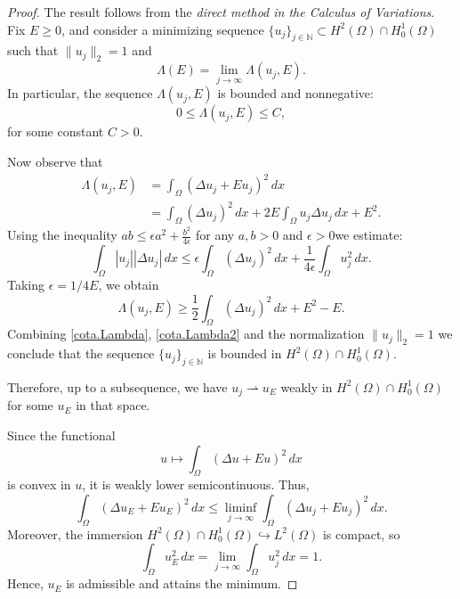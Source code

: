 \documentclass[10pt,a4paper]{amsart}
\newcommand{\N}{\mathbb{N}}
\begin{document}
\begin{proof}
The result follows from the \emph{direct method in the Calculus of Variations}. Fix $E \ge 0$, and consider a minimizing sequence $\{u_j\}_{j \in \N} \subset H^2(\Omega) \cap H^1_0(\Omega)$ such that $\|u_j\|_2 = 1$ and
$$
\Lambda(E) = \lim_{j \to \infty} \Lambda(u_j, E).
$$
In particular, the sequence $\Lambda(u_j, E)$ is bounded and nonnegative:
\begin{equation}\label{cota.Lambda}
0 \le \Lambda(u_j, E) \le C,
\end{equation}
for some constant $C > 0$.

Now observe that
\begin{align*}
\Lambda(u_j, E) &= \int_\Omega (\Delta u_j + Eu_j)^2\, dx \\
&= \int_\Omega (\Delta u_j)^2\, dx + 2E\int_\Omega u_j \Delta u_j \, dx+ E^2.
\end{align*}
Using the inequality $ab\le \epsilon a^2 + \frac{b^2}{4\epsilon}$ for any $a, b>0$ and $\epsilon >0$we estimate:
$$
\int_\Omega |u_j| |\Delta u_j|\, dx \le \epsilon \int_\Omega (\Delta u_j)^2\, dx + \frac{1}{4\epsilon}\int_\Omega u_j^2\, dx.
$$
Taking $\epsilon=1/4E$, we obtain
\begin{equation}\label{cota.Lambda2}
\Lambda(u_j, E)\ge \frac12 \int_\Omega (\Delta u_j)^2\, dx + E^2-E.
\end{equation}
Combining \eqref{cota.Lambda}, \eqref{cota.Lambda2} and the normalization $\|u_j\|_2=1$ we conclude that the sequence $\{u_j\}_{j\in\N}$ is bounded in $H^2(\Omega)\cap H^1_0(\Omega)$.

Therefore, up to a subsequence, we have $u_j \rightharpoonup u_E$ weakly in $H^2(\Omega) \cap H^1_0(\Omega)$ for some $u_E$ in that space.

Since the functional 
$$
u \mapsto \int_\Omega (\Delta u + E u)^2\, dx
$$ 
is convex in $u$, it is weakly lower semicontinuous. Thus,
$$
\int_\Omega (\Delta u_E + E u_E)^2\, dx \le \liminf_{j \to \infty} \int_\Omega (\Delta u_j + E u_j)^2\, dx.
$$
Moreover, the immersion $H^2(\Omega)\cap H^1_0(\Omega)\hookrightarrow L^2(\Omega)$ is compact, so
$$
\int_\Omega u_E^2\, dx = \lim_{j\to\infty} \int_\Omega u_j^2\, dx = 1.
$$
Hence, $u_E$ is admissible and attains the minimum.
\end{proof}
\end{document}
